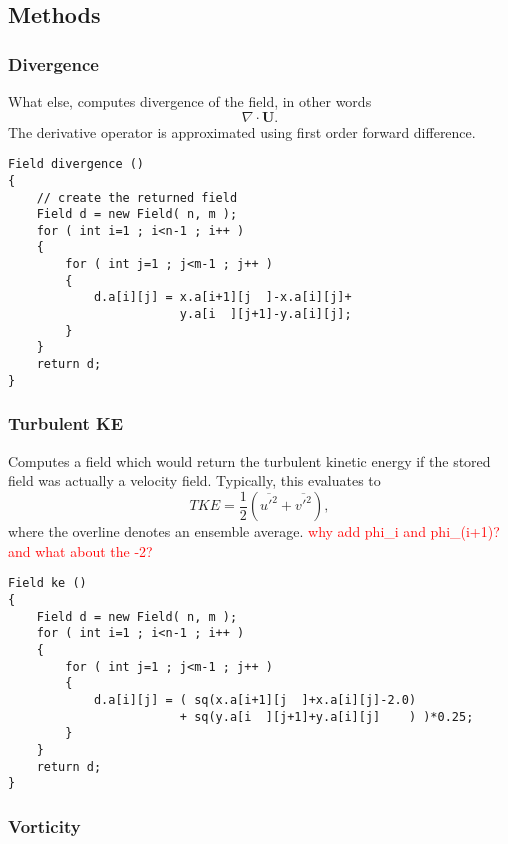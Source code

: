 \documentclass[notitlepage]{article}
\begin{document}
\subsection{Methods}

\subsubsection{Divergence}

What else, computes divergence of the field, in other words
%
\begin{equation}
\nabla \cdot \mathbf{U} .
\end{equation}
%
The derivative operator is approximated using first order forward difference.

\begin{lstlisting}[style=myCpp]
Field divergence ()
{
	// create the returned field
	Field d = new Field( n, m );
	for ( int i=1 ; i<n-1 ; i++ )
	{
		for ( int j=1 ; j<m-1 ; j++ )
		{
			d.a[i][j] = x.a[i+1][j  ]-x.a[i][j]+
						y.a[i  ][j+1]-y.a[i][j];
		}
	}
	return d;
}
\end{lstlisting}

\subsubsection{Turbulent KE}

Computes a field which would return the turbulent kinetic energy if the stored
field was actually a velocity field. Typically, this evaluates to
%
\begin{equation}
TKE = \frac{1}{2} \left( \overline{u'^2} + \overline{v'^2} \right),
\end{equation}
%
where the overline denotes an ensemble average.
\textcolor{red}{why add phi\_i and phi\_(i+1)? and what about the -2?}

\begin{lstlisting}[style=myCpp]
Field ke ()
{
	Field d = new Field( n, m );
	for ( int i=1 ; i<n-1 ; i++ )
	{
		for ( int j=1 ; j<m-1 ; j++ )
		{
			d.a[i][j] = ( sq(x.a[i+1][j  ]+x.a[i][j]-2.0)
				 		+ sq(y.a[i  ][j+1]+y.a[i][j]    ) )*0.25;
		}
	}
	return d;
}
\end{lstlisting}

\subsubsection{Vorticity}
\end{document}

